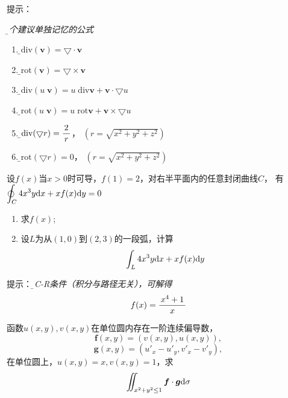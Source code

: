 \begin{frame}
	\linespread{1.2}
	\alert{提示：}{\it\b 几个建议单独记忆的公式 
	\begin{enumerate}[(1)]
	  \item \b$\mathrm{div}(\bm{v})=\bigtriangledown\cdot\bm{v}$
	  \item \b$\mathrm{rot}(\bm{v})=\bigtriangledown\times\bm{v}$
	  \item \b$\mathrm{div}(u\;\bm{v})=u\;\mathrm{div}\bm{v}
	  +\bm{v}\cdot\bigtriangledown u$
	  \item \b$\mathrm{rot}(u\;\bm{v})=u\;\mathrm{rot}\bm{v}
	  +\bm{v}\times\bigtriangledown u$
	  \item \b$\mathrm{div}(\bigtriangledown r)=\displaystyle\frac{\,{2}\,}{\,{r}\,}$，
	  \hspace{1cm} $(r=\sqrt{x^2+y^2+z^2})$
	  \item \b$\mathrm{rot}(\bigtriangledown r)=0$，
	  \hspace{1cm} $(r=\sqrt{x^2+y^2+z^2})$
	\end{enumerate}
	}
\end{frame}

\begin{frame}
	\linespread{1.2}
	设$f(x)$当$x>0$时可导，$f(1)=2$，对右半平面内的任意封闭曲线$C$，
	有$\displaystyle\oint_C4x^3y\mathrm{d} x+xf(x)\mathrm{d} y=0$
	\begin{enumerate}[(1)]
	  \item 求$f(x)$;
	  \item 设$L$为从$(1,0)$到$(2,3)$的一段弧，计算
	  $$\displaystyle\int_L4x^3y\mathrm{d} x+xf(x)\mathrm{d} y$$
	\end{enumerate}
		
	\bigskip\pause
	\alert{提示：}{\it\b 
	由C-R条件（积分与路径无关），可解得$$f(x)=\displaystyle\frac{\,{x^4+1}\,}{\,{x}\,}$$}
\end{frame}

\begin{frame}
	\linespread{1.2}
	函数$u(x,y),v(x,y)$在单位圆内存在一阶连续偏导数，
	$$\bm{f}(x,y)=(v(x,y),u(x,y)),$$
	$$\bm{g}(x,y)=\left(u'_x-u'_y,v'_x-v'_y\right),$$
	在单位圆上，$u(x,y)=x,v(x,y)=1$，求
	$$\iint_{x^2+y^2\leq 1}\bm{f}\cdot\bm{g}\mathrm{d}\sigma$$
		
\end{frame}

